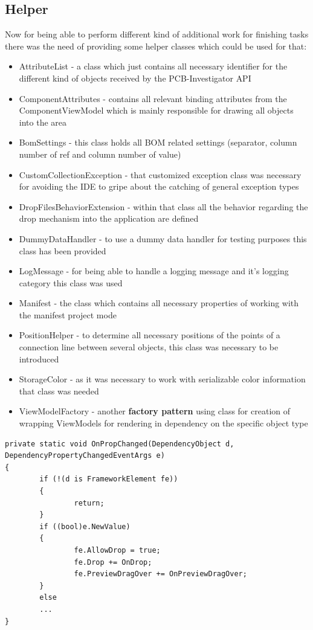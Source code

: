 		\subsection{Helper}
Now for being able to perform different kind of additional work for finishing tasks there was the need of providing some helper classes which could be used for that:
\begin{itemize}
	\item AttributeList - a class which just contains all necessary identifier for the different kind of objects received by the \ac{PCB}-Investigator \ac{API}
	\item ComponentAttributes - contains all relevant binding attributes from the ComponentViewModel which is mainly responsible for drawing all objects into the area
	\item BomSettings - this class holds all \ac{BOM} related settings (separator, column number of ref and column number of value)
	\item CustomCollectionException - that customized exception class was necessary for avoiding the \ac{IDE} to gripe about the catching of general exception types
	\item DropFilesBehaviorExtension - within that class all the behavior regarding the drop mechanism into the application are defined
	\item DummyDataHandler - to use a dummy data handler for testing purposes this class has been provided
	\item LogMessage - for being able to handle a logging message and it's logging category this class was used
	\item Manifest - the class which contains all necessary properties of working with the manifest project mode
	\item PositionHelper - to determine all necessary positions of the points of a connection line between several objects, this class was necessary to be introduced
	\item StorageColor - as it was necessary to work with serializable color information that class was needed
	\item ViewModelFactory - another \textbf{factory pattern} using class for creation of wrapping ViewModels for rendering in dependency on the specific object type
\end{itemize}

\begin{lstlisting}[language={[Sharp]C},caption={OnPropChanged},captionpos=b,label=lst:OnPropChanged]
 private static void OnPropChanged(DependencyObject d, DependencyPropertyChangedEventArgs e)
{
		if (!(d is FrameworkElement fe))
		{
				return;
		}
		if ((bool)e.NewValue)
		{
				fe.AllowDrop = true;
				fe.Drop += OnDrop;
				fe.PreviewDragOver += OnPreviewDragOver;
		}
		else
		...
}
\end{lstlisting}

